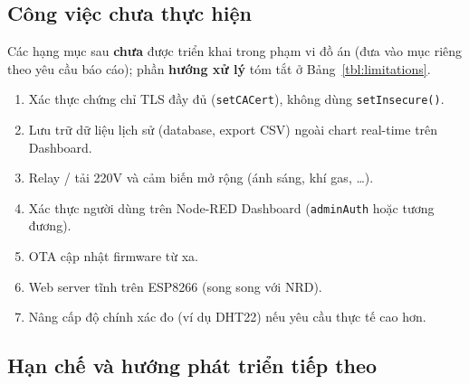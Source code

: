\documentclass[13pt,a4paper]{article}
\newcommand{\code}[1]{\texttt{#1}}
\begin{document}
\subsection{Công việc chưa thực hiện}
\label{sec:chualam}

Các hạng mục sau \textbf{chưa} được triển khai trong phạm vi đồ án (đưa vào mục riêng theo yêu cầu báo cáo); phần \textbf{hướng xử lý} tóm tắt ở Bảng~\ref{tbl:limitations}.

\begin{enumerate}[label=\arabic*., leftmargin=1.5cm]
    \item Xác thực chứng chỉ TLS đầy đủ (\code{setCACert}), không dùng \code{setInsecure()}.
    \item Lưu trữ dữ liệu lịch sử (database, export CSV) ngoài chart real-time trên Dashboard.
    \item Relay / tải 220V và cảm biến mở rộng (ánh sáng, khí gas, \ldots).
    \item Xác thực người dùng trên Node-RED Dashboard (\code{adminAuth} hoặc tương đương).
    \item OTA cập nhật firmware từ xa.
    \item Web server tĩnh trên ESP8266 (song song với NRD).
    \item Nâng cấp độ chính xác đo (ví dụ DHT22) nếu yêu cầu thực tế cao hơn.
\end{enumerate}

\subsection{Hạn chế và hướng phát triển tiếp theo}
\label{sec:gioi}
\end{document}
